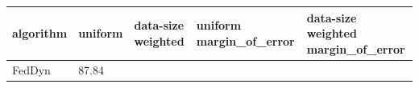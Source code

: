 \begin{tabular}{lllll}
\toprule
algorithm & uniform & data-size weighted & uniform margin_of_error & data-size weighted margin_of_error \\
\midrule
FedDyn & 87.84%
\bottomrule
\end{tabular}

